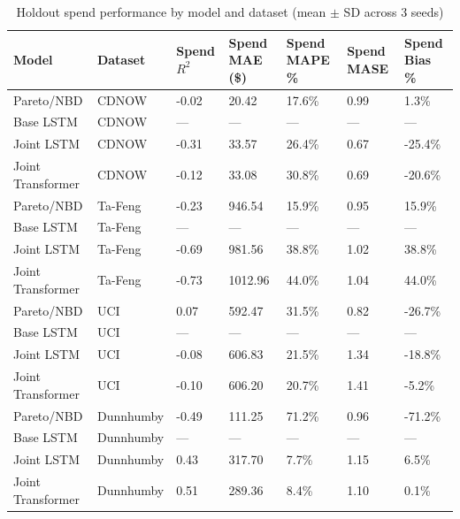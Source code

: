 \begin{table}
\caption{Holdout spend performance by model and dataset (mean $\pm$ SD across 3 seeds)}
\label{tab:model_comparison_aggregated_spend}
\begin{tabular}{lllllll}
\toprule
Model & Dataset & Spend $R^2$ & Spend MAE (\$) & Spend MAPE \% & Spend MASE & Spend Bias \% \\
\midrule
Pareto/NBD & CDNOW & -0.02 & 20.42 & 17.6\% & 0.99 & 1.3\% \\
Base LSTM & CDNOW & — & — & — & — & — \\
Joint LSTM & CDNOW & -0.31 & 33.57 & 26.4\% & 0.67 & -25.4\% \\
Joint Transformer & CDNOW & -0.12 & 33.08 & 30.8\% & 0.69 & -20.6\% \\
Pareto/NBD & Ta-Feng & -0.23 & 946.54 & 15.9\% & 0.95 & 15.9\% \\
Base LSTM & Ta-Feng & — & — & — & — & — \\
Joint LSTM & Ta-Feng & -0.69 & 981.56 & 38.8\% & 1.02 & 38.8\% \\
Joint Transformer & Ta-Feng & -0.73 & 1012.96 & 44.0\% & 1.04 & 44.0\% \\
Pareto/NBD & UCI & 0.07 & 592.47 & 31.5\% & 0.82 & -26.7\% \\
Base LSTM & UCI & — & — & — & — & — \\
Joint LSTM & UCI & -0.08 & 606.83 & 21.5\% & 1.34 & -18.8\% \\
Joint Transformer & UCI & -0.10 & 606.20 & 20.7\% & 1.41 & -5.2\% \\
Pareto/NBD & Dunnhumby & -0.49 & 111.25 & 71.2\% & 0.96 & -71.2\% \\
Base LSTM & Dunnhumby & — & — & — & — & — \\
Joint LSTM & Dunnhumby & 0.43 & 317.70 & 7.7\% & 1.15 & 6.5\% \\
Joint Transformer & Dunnhumby & 0.51 & 289.36 & 8.4\% & 1.10 & 0.1\% \\
\bottomrule
\end{tabular}
\end{table}
